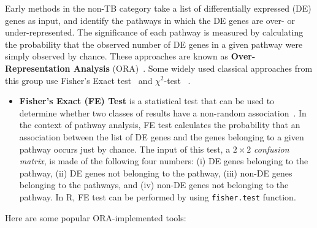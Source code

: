 Early methods in the non-TB category take a list of differentially expressed (DE) genes as input, and identify the pathways in which the DE genes are over- or under-represented.
The significance of each pathway is measured by calculating the probability that the observed number of DE genes in a given pathway were simply observed by chance. 
These approaches are known as \textbf{Over-Representation Analysis} (ORA)~\cite{khatri2005comparison, goeman2007analyzing}.
Some widely used classical approaches from this group use Fisher's Exact test~\cite{Fisher:1951} and $\chi^2$-test ~\cite{Fisher:1993}. 

\begin{itemize}
\item \textbf{Fisher's Exact (FE) Test} is a statistical test that can be used to determine whether two  classes of results have a non-random association~\cite{Fisher:1951}.
In the context of pathway analysis,  FE test calculates the probability that an association between the list of DE genes and the genes belonging to a given pathway occurs just by chance.
The input of this test, a $2 \times 2$ \textit{confusion matrix}, is made of the following four numbers: (i) DE genes belonging to the pathway, (ii) DE genes not belonging to the pathway, (iii) non-DE genes belonging to the pathways, and (iv) non-DE genes not belonging to the pathway. 
In R, FE test can be performed by using \texttt{fisher.test} function.
\end{itemize}


Here are some popular ORA-implemented tools:

